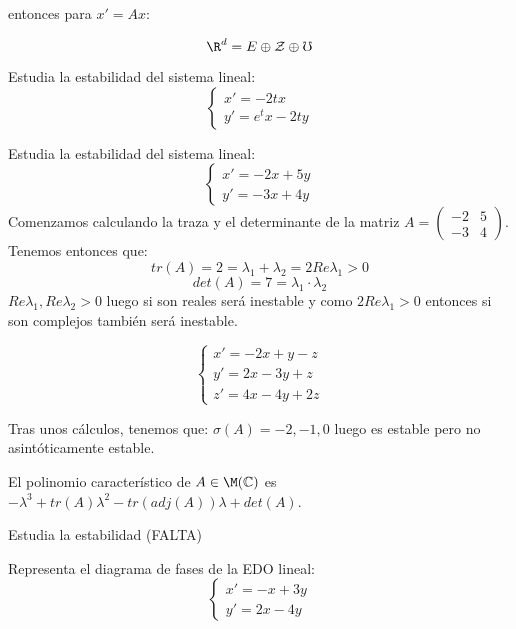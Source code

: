 entonces para $x'=Ax$:

$$\R^d=E\oplus\mathcal{Z}\oplus\mho$$

\begin{ejer}
Estudia la estabilidad del sistema lineal:
\[
\left\{\begin{array}{ll}
x'=-2tx \\
y'=e^tx-2ty
\end{array}\right.
\]
\end{ejer}
\begin{ejer}
Estudia la estabilidad del sistema lineal:
\[
\left\{\begin{array}{ll}
x'=-2x+5y\\
y'=-3x+4y
\end{array}\right.
\]
Comenzamos calculando la traza y el determinante de la matriz $A=\begin{pmatrix}-2 & 5 \\ -3 & 4 \end{pmatrix}$. Tenemos entonces que:
$$tr(A)=2=\lambda_1+\lambda_2=2 Re \lambda_1 >0$$
$$det(A)=7=\lambda_1 \cdot \lambda_2$$
$Re\lambda_1, Re\lambda_2>0$ luego si son reales será inestable y como $2 Re \lambda_1 >0$ entonces si son complejos también será inestable.
\end{ejer}

\begin{ejer}
\[
\left\{\begin{array}{ll}
x'=-2x+y-z\\
y'=2x-3y+z\\
z'=4x-4y+2z
\end{array}\right.
\]

Tras unos cálculos, tenemos que: $\sigma(A)={-2,-1,0}$ luego es estable pero no asintóticamente estable.
\end{ejer}

\begin{nota}
 El polinomio característico de $A\in\M(\mathbb{C})$ es $-\lambda^3+tr(A)\lambda^2-tr(adj(A))\lambda+det(A)$.
\end{nota}

\begin{ejer}
Estudia la estabilidad (FALTA)
\end{ejer}

\begin{ejer}
Representa el diagrama de fases de la EDO lineal:
\[
\left\{\begin{array}{ll}
x'=-x+3y\\
y'=2x-4y
\end{array}\right.
\]
\end{ejer}

